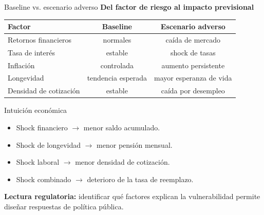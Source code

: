 \documentclass[10pt,aspectratio=169]{beamer}
\begin{document}
\begin{frame}{Baseline vs. escenario adverso}
\textbf{Del factor de riesgo al impacto previsional}

\vspace{0.2cm}

\begin{table}
\centering
\small
\begin{tabular}{lcc}
\hline
\textbf{Factor} & \textbf{Baseline} & \textbf{Escenario adverso} \\
\hline
Retornos financieros & normales & caída de mercado \\
Tasa de interés & estable & shock de tasas \\
Inflación & controlada & aumento persistente \\
Longevidad & tendencia esperada & mayor esperanza de vida \\
Densidad de cotización & estable & caída por desempleo \\
\hline
\end{tabular}
\end{table}

\vspace{0.3cm}

\begin{block}{Intuición económica}
\begin{itemize}
    \item Shock financiero $\rightarrow$ menor saldo acumulado.
    \item Shock de longevidad $\rightarrow$ menor pensión mensual.
    \item Shock laboral $\rightarrow$ menor densidad de cotización.
    \item Shock combinado $\rightarrow$ deterioro de la tasa de reemplazo.
\end{itemize}
\end{block}

\textbf{Lectura regulatoria:} identificar qué factores explican la vulnerabilidad permite diseñar respuestas de política pública.
\end{frame}
\end{document}
